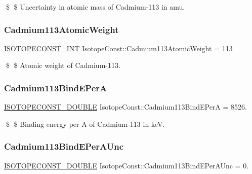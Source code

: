 \$ \$ Uncertainty in atomic mass of Cadmium-\/113 in amu. \mbox{\label{group___isotope_const-_cadmium-_cd113_gae4f4526923aef903eedf92b88b80942b}} 
\subsubsection{\texorpdfstring{Cadmium113\+Atomic\+Weight}{Cadmium113AtomicWeight}}
{\footnotesize\ttfamily \mbox{\hyperlink{group___isotope_const-_macros_ga5f18360b3e99483a35c32d789e62621c}{I\+S\+O\+T\+O\+P\+E\+C\+O\+N\+S\+T\+\_\+\+I\+NT}} Isotope\+Const\+::\+Cadmium113\+Atomic\+Weight = 113}

\$ \$ Atomic weight of Cadmium-\/113. \mbox{\label{group___isotope_const-_cadmium-_cd113_ga12151a95effa4bd30891f84ce5302bc2}} 
\subsubsection{\texorpdfstring{Cadmium113\+Bind\+E\+PerA}{Cadmium113BindEPerA}}
{\footnotesize\ttfamily \mbox{\hyperlink{group___isotope_const-_macros_ga8f45a7272ce02c0b4c65c44636ed719a}{I\+S\+O\+T\+O\+P\+E\+C\+O\+N\+S\+T\+\_\+\+D\+O\+U\+B\+LE}} Isotope\+Const\+::\+Cadmium113\+Bind\+E\+PerA = 8526.}

\$ \$ Binding energy per A of Cadmium-\/113 in keV. \mbox{\label{group___isotope_const-_cadmium-_cd113_ga5f6c245643d5ef0c3abb76991503d203}} 
\subsubsection{\texorpdfstring{Cadmium113\+Bind\+E\+Per\+A\+Unc}{Cadmium113BindEPerAUnc}}
{\footnotesize\ttfamily \mbox{\hyperlink{group___isotope_const-_macros_ga8f45a7272ce02c0b4c65c44636ed719a}{I\+S\+O\+T\+O\+P\+E\+C\+O\+N\+S\+T\+\_\+\+D\+O\+U\+B\+LE}} Isotope\+Const\+::\+Cadmium113\+Bind\+E\+Per\+A\+Unc = 0.}

